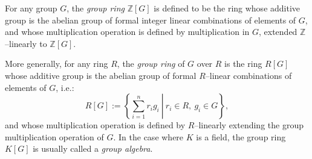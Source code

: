 \documentclass[12pt]{article}
\begin{document}
For any group $G$, the {\em group ring} $\mathbb{Z}[G]$ is defined to be the ring whose additive group is the abelian group of formal integer linear combinations of elements of $G$, and whose multiplication operation is defined by multiplication in $G$, extended $\mathbb{Z}$--linearly to $\mathbb{Z}[G]$.

More generally, for any ring $R$, the {\em group ring} of $G$ over $R$ is the ring $R[G]$ whose additive group is the abelian group of formal $R$--linear combinations of elements of $G$, i.e.:
$$
R[G] := \left\{\left. \sum_{i=1}^n r_i g_i\ \right|\ r_i \in R,\ g_i \in G\right\},
$$
and whose multiplication operation is defined by $R$--linearly extending the group multiplication operation of $G$. In the case where $K$ is a field, the group ring $K[G]$ is usually called a {\em group algebra}.
\end{document}
